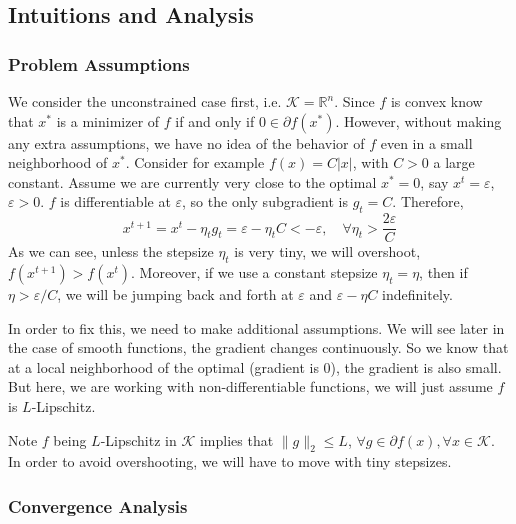 \documentclass{scrartcl}
\newcommand{\RR}{\mathbb{R}}
\newcommand{\sK}{\mathcal{K}}
\begin{document}
\subsection{Intuitions and Analysis}

\subsubsection{Problem Assumptions}
\label{sec:subgrad-descent-assumption}

We consider the unconstrained case first, i.e. $\sK=\RR^n$. Since $f$ is convex know that $x^*$ is a
minimizer of $f$ if and only if $0\in\partial f (x^*)$. However, without making any extra
assumptions, we have no idea of the behavior of $f$ even in a small neighborhood of $x^*$. Consider
for example $f(x)=C|x|$, with $C>0$ a large constant. Assume we are currently very close to the
optimal $x^*=0$, say $x^t=\varepsilon$, $\varepsilon>0$. $f$ is differentiable at $\varepsilon$, so
the only subgradient is $g_t=C$. Therefore,
\[
  x^{t+1} = x^t - \eta_t g_t
  = \varepsilon - \eta_tC < -\varepsilon, \quad \forall \eta_t > \frac {2\varepsilon} {C}
\]
As we can see, unless the stepsize $\eta_t$ is very tiny, we will overshoot, $f(x^{t+1})>f(x^t)$.
Moreover, if we use a constant stepsize $\eta_t=\eta$, then if $\eta >\varepsilon/C$, we will be
jumping back and forth at $\varepsilon$ and $\varepsilon - \eta C$ indefinitely.

In order to fix this, we need to make additional assumptions. We will see later in the case of
smooth functions, the gradient changes continuously. So we know that at a local neighborhood of the
optimal (gradient is 0), the gradient is also small. But here, we are working with
non-differentiable functions, we will just assume $f$ is $L$-Lipschitz.

Note $f$ being $L$-Lipschitz in $\sK$ implies that $\|g\|_2 \leq L$, $\forall g\in\partial f(x),
\forall x\in\sK$. In order to avoid overshooting, we will have to move with tiny stepsizes.

\subsubsection{Convergence Analysis}
\label{sec:subgrad-lipschitz-analysis}
\end{document}
